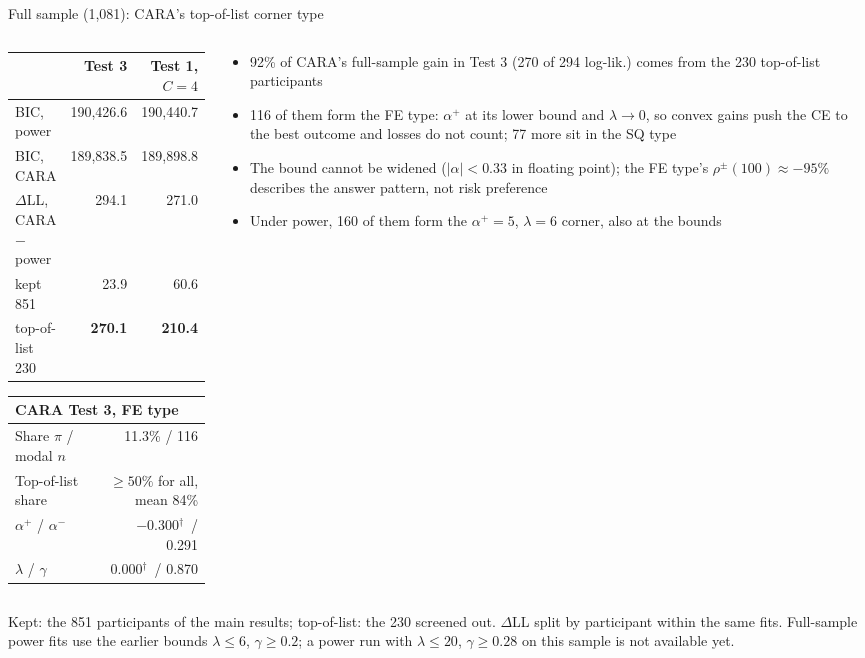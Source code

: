 \documentclass[aspectratio=169,11pt]{beamer}
\newcommand{\ap}{\alpha^{+}}
\newcommand{\am}{\alpha^{-}}
\newcommand{\bd}{\ensuremath{^{\dagger}}}
\newcommand{\tabnote}[1]{\par\vfill{\scriptsize\color{muted}#1\par}}
\newcommand{\tight}{\setlength{\itemsep}{3pt}}
\begin{document}
\begin{frame}{Full sample (1{,}081): CARA's top-of-list corner type}
\begin{columns}[T,onlytextwidth]
\begin{column}{0.50\textwidth}
\centering\footnotesize\setlength{\tabcolsep}{4pt}
\begin{tabular}{l rr}
\toprule
& Test 3 & Test 1, $C=4$\\
\midrule
BIC, power & 190{,}426.6 & 190{,}440.7\\
BIC, CARA & 189{,}838.5 & 189{,}898.8\\
\midrule
$\Delta$LL, CARA $-$ power & 294.1 & 271.0\\
\quad kept 851 & 23.9 & 60.6\\
\quad top-of-list 230 & \textbf{270.1} & \textbf{210.4}\\
\bottomrule
\end{tabular}

\vspace{8pt}
\begin{tabular}{l r}
\toprule
\multicolumn{2}{l}{CARA Test 3, FE type}\\
\midrule
Share $\pi$ / modal $n$ & 11.3\% / 116\\
Top-of-list share & $\ge 50\%$ for all, mean 84\%\\
$\ap$ / $\am$ & $-0.300$\bd\ / 0.291\\
$\lambda$ / $\gamma$ & 0.000\bd\ / 0.870\\
\bottomrule
\end{tabular}
\end{column}
\begin{column}{0.47\textwidth}
\begin{itemize}\small\tight
  \item 92\% of CARA's full-sample gain in Test 3 (270 of 294 log-lik.) comes from the 230 top-of-list participants
  \item 116 of them form the FE type: $\ap$ at its lower bound and $\lambda\to 0$, so convex gains push the CE to the best outcome and losses do not count; 77 more sit in the SQ type
  \item The bound cannot be widened ($|\alpha|<0.33$ in floating point); the FE type's $\rho^{\pm}(100)\approx-95\%$ describes the answer pattern, not risk preference
  \item Under power, 160 of them form the $\ap=5$, $\lambda=6$ corner, also at the bounds
\end{itemize}
\end{column}
\end{columns}
\tabnote{Kept: the 851 participants of the main results; top-of-list: the 230 screened out. $\Delta$LL split by participant within the same fits. Full-sample power fits use the earlier bounds $\lambda\le 6$, $\gamma\ge 0.2$; a power run with $\lambda\le 20$, $\gamma\ge 0.28$ on this sample is not available yet.}
\end{frame}
\end{document}

